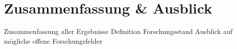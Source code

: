\section{Zusammenfassung \& Ausblick}

Zusammenfassung aller Ergebnisse
Definition Forschungsstand
Ausblick auf mögliche offene Forschungsfelder